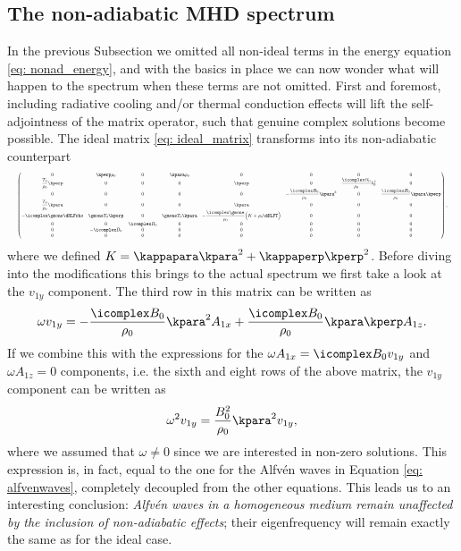 \subsection{The non-adiabatic MHD spectrum}
In the previous Subsection we omitted all non-ideal terms in the energy equation \eqref{eq: nonad_energy}, and with the basics in place we can now wonder what will happen to the spectrum when these terms are not omitted. First and foremost, including radiative cooling and/or thermal conduction effects will lift the self-adjointness of the matrix operator, such that genuine complex solutions become possible. The ideal matrix \eqref{eq: ideal_matrix} transforms into its non-adiabatic counterpart
\begin{equation} \label{eq: nonadiabatic_matrix}
  \resizebox{\hsize}{!}{$
    \begin{pmatrix}
      0 & \kperp \rho_0 & 0 & \kpara \rho_0 & 0 & 0 & 0 & 0 \\
      \dfrac{T_0}{\rho_0}\kperp & 0 & 0 & 0 & \kperp & 0 & \dfrac{\icomplex B_0}{\rho_0}k_0^2 & 0 \\
      0 & 0 & 0 & 0 & 0 & -\dfrac{\icomplex B_0}{\rho_0}\kpara^2 & 0 & \dfrac{\icomplex B_0}{\rho_0}\kpara \kperp \\
      \dfrac{T_0}{\rho_0}\kpara & 0 & 0 & 0 & \kpara & 0 & 0 & 0 \\
      -\icomplex\gmone \dHLFrho &
        \gmone T_0 \kperp &
        0 &
        \gmone T_0 \kpara &
        -\dfrac{\icomplex\gmone}{\rho_0}\Bigl(K + \rho_0 \dHLFT\Bigr) &
        0 &
        0 &
        0 \\
      0 & 0 & \icomplex B_0 & 0 & 0 & 0 & 0 & 0 \\
      0 & -\icomplex B_0 & 0 & 0 & 0 & 0 & 0 & 0 \\
      0 & 0 & 0 & 0 & 0 & 0 & 0 & 0
    \end{pmatrix},
  $}
\end{equation}
where we defined $K = \kappapara \kpara^2 + \kappaperp \kperp^2$. Before diving into the modifications this brings to the actual spectrum we first take a look at the $v_{1y}$ component. The third row in this matrix can be written as
\begin{equation}
  \omega v_{1y} = -\frac{\icomplex B_0}{\rho_0}\kpara^2 A_{1x} + \frac{\icomplex B_0}{\rho_0}\kpara\kperp A_{1z}.
\end{equation}
If we combine this with the expressions for the $\omega A_{1x} = \icomplex B_0 v_{1y}$ and $\omega A_{1z} = 0$ components, i.e. the sixth and eight rows of the above matrix, the $v_{1y}$ component can be written as
\begin{equation}
  \omega^2 v_{1y} = \frac{B_0^2}{\rho_0}\kpara^2 v_{1y},
\end{equation}
where we assumed that $\omega \neq 0$ since we are interested in non-zero solutions. This expression is, in fact, equal to the one for the Alfv\'en waves in Equation \eqref{eq: alfvenwaves}, completely decoupled from the other equations. This leads us to an interesting conclusion: \emph{Alfv\'en waves in a homogeneous medium remain unaffected by the inclusion of non-adiabatic effects}; their eigenfrequency will remain exactly the same as for the ideal case.

